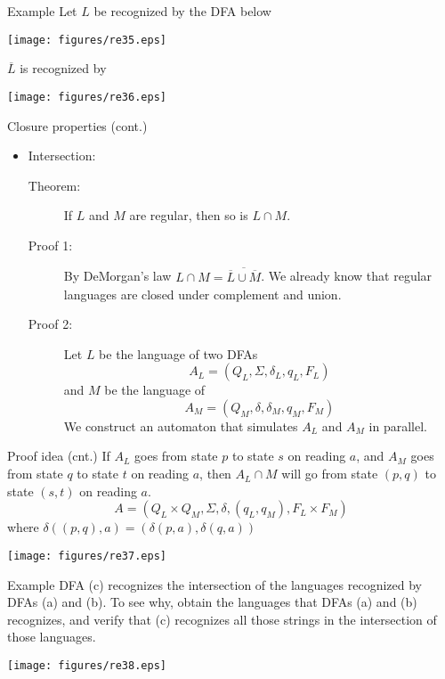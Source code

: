 \documentclass{prosper}%
\newcommand{\sg}{{\mbox{$\Sigma$}}}
\begin{document}
\begin{slide}{Example}
Let $L$ be recognized by the DFA below
\begin{center}
 \texttt{[image: figures/re35.eps]}
\end{center}
$\overline{L}$ is recognized by
\begin{center}
 \texttt{[image: figures/re36.eps]}
\end{center}
\end{slide}

\begin{slide}{Closure properties (cont.)}
\begin{itemize}
\item {\blue Intersection}:
\begin{description}
\item[Theorem:] If $L$ and $M$ are regular, then so is $L 
\cap M$. 
\item[Proof 1:] By DeMorgan's law $L\cap M = \overline{\overline{L} \cup \overline{M}}$. We already know that regular languages are closed under complement and union. 

\item[Proof 2:] Let $L$ be the language of two DFAs
\[A_L = (Q_L, \sg, \delta_L, q_L, F_L)\]  and $M$ be the language of \[A_M = (Q_M , \delta, \delta_M , q_M , F_M)\] We construct an automaton that simulates $A_L$ and $A_M$ in parallel.
\end{description}
\end{itemize}
\end{slide}

\begin{slide}{Proof  idea (cnt.)}
If $A_L$ goes from state $p$ to state $s$ on reading $a$, 
and $A_M$ goes from state $q$ to state $t$ on reading 
$a$, then $A_L\cap M$ will go from state $(p, q)$ to state 
$(s, t)$ on reading $a$.
\[
A=(Q_L\times Q_M, \Sigma, \delta, (q_L,q_M), F_L\times F_M)
\] where $\delta((p,q), a) = (\delta(p, a), \delta(q, a))$
\begin{center}
 \texttt{[image: figures/re37.eps]}
\end{center}
\end{slide}

\begin{slide}{Example}
DFA (c) recognizes the intersection of the languages recognized by DFAs (a) and (b). To see why, obtain the languages that DFAs (a) and (b) recognizes, and verify that (c) recognizes all those strings in the intersection of those languages.
\begin{center}
 \texttt{[image: figures/re38.eps]}
\end{center}
\end{slide}
\end{document}
